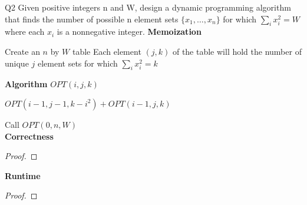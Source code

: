 \begin{problem}
  {Q2}
  Given positive integers n and W, design a dynamic programming algorithm that finds
  the number of possible n element sets $\{x_1, \dots , x_n\}$ for which $\sum_i x_i^2 = W$ where each
  $x_i$ is a nonnegative integer.
  \noindent
  \textbf{Memoization}
  \begin{algorithmic}[1]
    \STATE Create an $n$ by $W$ table
    \STATE Each element $(j, k)$ of the table will hold the number of unique $j$ element sets for which $\sum_i x_i^2 = k$
  \end{algorithmic}
  \textbf{Algorithm}
  $OPT(i, j, k)$
  \begin{algorithmic}[1]
    \ENDIF
    \RETURN $OPT(i-1, j-1, k-i^2) + OPT(i-1, j, k)$
  \end{algorithmic}
  Call $OPT(0, n, W)$ \\
  \textbf{Correctness}
  \begin{proof}
  \end{proof}
  \noindent
  \textbf{Runtime}
  \begin{proof}
  \end{proof}
\end{problem}
